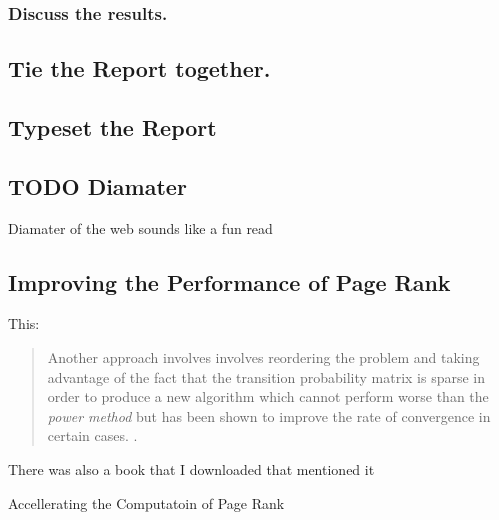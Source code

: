 \documentclass[11pt]{article}
\begin{document}
\subsubsection{Discuss the results.}
\label{sec:orgc4b45f8}
\subsection{Tie the Report together.}
\label{sec:org4c89977}
\subsection{Typeset the Report}
\label{sec:org8107271}

\subsection{TODO Diamater}
\label{sec:org2b210d3}
Diamater of the web sounds like a fun read \cite{albertDiameterWorldWideWeb1999}
\subsection{Improving the Performance of Page Rank}
\label{sec:org5c3652c}

This:

\begin{quote}
Another approach involves involves reordering the problem and taking advantage
of the fact that the transition probability matrix is sparse  in order
to produce a new algorithm which cannot perform worse than the \emph{power method}
but has been shown to improve the rate of convergence in certain cases.
\cite{langvilleReorderingPageRankProblem2006}.
\end{quote}


There was also a book that I downloaded that mentioned it

Accellerating the Computatoin of Page Rank \cite{langvilleGooglePageRankScience2012}
\end{document}
